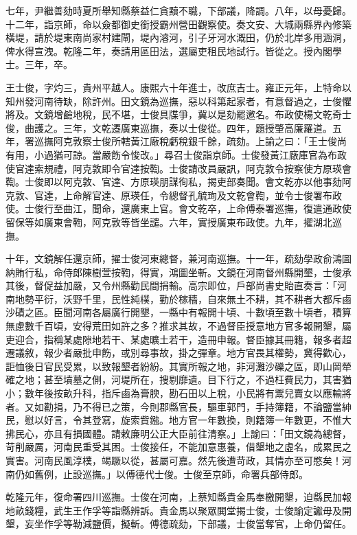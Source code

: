 \begin{pinyinscope}
七年，尹繼善劾時夏所舉知縣蔡益仁貪黷不職，下部議，降調。八年，以母憂歸。十二年，詣京師，命以僉都御史銜授霸州營田觀察使。奏文安、大城兩縣界內修築橫堤，請於堤東南尚家村建閘，堤內濬河，引子牙河水溉田，仍於北岸多用涵洞，俾水得宣洩。乾隆二年，奏請用區田法，選屬吏租民地試行。皆從之。授內閣學士。三年，卒。

王士俊，字灼三，貴州平越人。康熙六十年進士，改庶吉士。雍正元年，上特命以知州發河南待缺，除許州。田文鏡為巡撫，惡以科第起家者，有意督過之，士俊懼將及。文鏡增鹼地稅，民不堪，士俊具牒爭，冀以是劾罷邀名。布政使楊文乾奇士俊，曲護之。三年，文乾遷廣東巡撫，奏以士俊從。四年，題授肇高廉羅道。五年，署巡撫阿克敦察士俊所轄黃江廠稅虧稅銀千餘，疏劾。上諭之曰：「王士俊尚有用，小過猶可諒。當嚴飭令悛改。」尋召士俊詣京師。士俊發黃江廠庫官為布政使官達索規禮，阿克敦即令官達按鞫。士俊請改員嚴訊，阿克敦令按察使方原瑛會鞫。士俊即以阿克敦、官達、方原瑛朋謀徇私，揭吏部奏聞。會文乾亦以他事劾阿克敦、官達，上命解官達、原瑛任，令總督孔毓珣及文乾會鞫，並令士俊署布政使。士俊行至曲江，聞命，還廣東上官。會文乾卒，上命傅泰署巡撫，復遣通政使留保等如廣東會鞫，阿克敦等皆坐譴。六年，實授廣東布政使。九年，擢湖北巡撫。

十年，文鏡解任還京師，擢士俊河東總督，兼河南巡撫。十一年，疏劾學政俞鴻圖納賄行私，命侍郎陳樹萱按鞫，得實，鴻圖坐斬。文鏡在河南督州縣開墾，士俊承其後，督促益加嚴，又令州縣勸民間捐輸。高宗即位，戶部尚書史貽直奏言：「河南地勢平衍，沃野千里，民性純樸，勤於稼穡，自來無土不耕，其不耕者大都斥鹵沙磧之區。臣聞河南各屬廣行開墾，一縣中有報開十頃、十數頃至數十頃者，積算無慮數千百頃，安得荒田如許之多？推求其故，不過督臣授意地方官多報開墾，屬吏迎合，指稱某處隙地若干、某處曠土若干，造冊申報。督臣據其冊籍，報多者超遷議敘，報少者嚴批申飭，或別尋事故，掛之彈章。地方官畏其權勢，冀得歡心，詎恤後日官民受累，以致報墾者紛紛。其實所報之地，非河灘沙礫之區，即山岡犖確之地；甚至墳墓之側，河堤所在，搜剔靡遺。目下行之，不過枉費民力，其害猶小；數年後按畝升科，指斥鹵為膏腴，勘石田以上稅，小民將有鬻兒賣女以應輸將者。又如勸捐，乃不得已之策，今則郡縣官長，驅車郭門，手持簿籍，不論鹽當紳民，慰以好言，令其登寫，旋索貲鏹。地方官一年數換，則籍簿一年數更，不惟大拂民心，亦且有損國體。請敕廉明公正大臣前往清察。」上諭曰：「田文鏡為總督，苛削嚴厲，河南民重受其困。士俊接任，不能加意惠養，借墾地之虛名，成累民之實害。河南民風淳樸，竭蹶以從，甚屬可嘉。然先後遭苛政，其情亦至可愍矣！河南仍如舊例，止設巡撫。」以傅德代士俊。士俊至京師，命署兵部侍郎。

乾隆元年，復命署四川巡撫。士俊在河南，上蔡知縣貴金馬奉檄開墾，迫縣民加報地畝錢糧，武生王作孚等詣縣辨訴。貴金馬以聚眾閧堂揭士俊，士俊諭定讞毋及開墾，妄坐作孚等勒減鹽價，擬斬。傅德疏劾，下部議，士俊當奪官，上命仍留任。


\end{pinyinscope}
